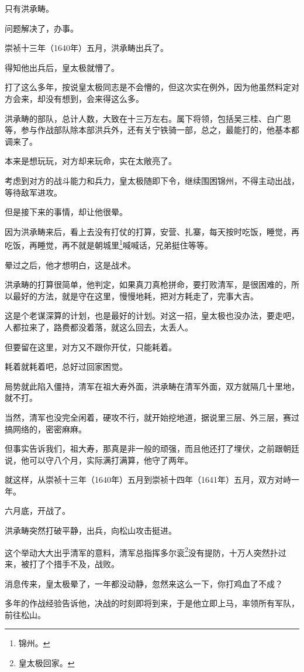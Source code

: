 \begin{multicols}{\theparacolNo}
只有洪承畴。

问题解决了，办事。

崇祯十三年（1640年）五月，洪承畴出兵了。

得知他出兵后，皇太极就懵了。

打了这么多年，按说皇太极同志是不会懵的，但这次实在例外，因为他虽然料定对方会来，却没有想到，会来得这么多。

洪承畴的部队，总计人数，大致在十三万左右。属下将领，包括吴三桂、白广恩等，参与作战部队除本部洪兵外，还有关宁铁骑一部，总之，最能打的，他基本都调来了。

本来是想玩玩，对方却来玩命，实在太敞亮了。

考虑到对方的战斗能力和兵力，皇太极随即下令，继续围困锦州，不得主动出战，等待敌军进攻。

但是接下来的事情，却让他很晕。

因为洪承畴来后，看上去没有打仗的打算，安营、扎寨，每天按时吃饭，睡觉，再吃饭，再睡觉，再不就是朝城里\footnote{锦州。}喊喊话，兄弟挺住等等。

晕过之后，他才想明白，这是战术。

洪承畴的打算很简单，他判定，如果真刀真枪拼命，要打败清军，是很困难的，所以最好的方法，就是守在这里，慢慢地耗，把对方耗走了，完事大吉。

这是个老谋深算的计划，也是最好的计划。对这一招，皇太极也没办法，要走吧，人都拉来了，路费都没着落，就这么回去，太丢人。

但要留在这里，对方又不跟你开仗，只能耗着。

耗着就耗着吧，总好过回家困觉。

局势就此陷入僵持，清军在祖大寿外面，洪承畴在清军外面，双方就隔几十里地，就不打。

当然，清军也没完全闲着，硬攻不行，就开始挖地道，据说里三层、外三层，赛过搞网络的，密密麻麻。

但事实告诉我们，祖大寿，那真是非一般的顽强，而且他还打了埋伏，之前跟朝廷说，他可以守八个月，实际满打满算，他守了两年。

就这样，从崇祯十三年（1640年）五月到崇祯十四年（1641年）五月，双方对峙一年。

六月底，开战了。

洪承畴突然打破平静，出兵，向松山攻击挺进。

这个举动大大出乎清军的意料，清军总指挥多尔衮\footnote{皇太极回家。}没有提防，十万人突然扑过来，被打了个措手不及，战败。

消息传来，皇太极晕了，一年都没动静，忽然来这么一下，你打鸡血了不成？

多年的作战经验告诉他，决战的时刻即将到来，于是他立即上马，率领所有军队，前往松山。


\end{multicols}
